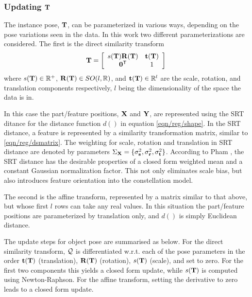 \subsubsection{Updating $\mathbf{T}$}
The instance pose, $\mathbf{T}$, can be parameterized in various ways, depending on the pose variations seen in the data. In this work two different parameterizations are considered. The first is the direct similarity transform
\begin{equation}
	\mathbf{T}=\left[\begin{array}{cc}
			s(\mathbf{T})\mathbf{R}(\mathbf{T}) & \mathbf{t}(\mathbf{T})\\
		\mathbf{0}^{\textsf{T}} & 1\end{array}\right]
	\label{eqn/reg/dsmatrix}
\end{equation}
where $s(\mathbf{T})\in\mathbb{R}^+$, $\mathbf{R}(\mathbf{T})\in SO(l,\mathbb{R})$, and $\mathbf{t}(\mathbf{T})\in\mathbb{R}^l$ are the scale, rotation, and translation components respectively, $l$ being the dimensionality of the space the data is in. 

In this case the part/feature positions, $\mathbf{X}$ and $\mathbf{Y}$, are represented using the SRT ditance \cite{Pham2011} for the distance function $d()$ in equation \ref{eqn/reg/shape}. In the SRT distance, a feature is represented by a similarity transformation matrix, similar to \ref{eqn/reg/dsmatrix}. The weighting for scale, rotation and translation in SRT distance are denoted by parameters ${\Sigma_{\mathbf{X}}} = \{{\sigma^{2}_{\mathbf{s}}}, {\sigma^{2}_{\mathbf{r}}}, {\sigma^{2}_{\mathbf{t}}}\}$.
According to Pham \etal \cite{Pham2011}, the SRT distance has the desirable properties of a closed form weighted mean and a constant Gaussian normalization factor. This not only eliminates scale bias, but also introduces feature orientation into the constellation model.

The second is the affine transform, represented by a matrix similar to that above, but whose first $l$ rows can take any real values. In this situation the part/feature positions are parameterized by translation only, and $d()$ is simply Euclidean distance.

The update steps for object pose are summarised as below. 
For the direct similarity transform, $\mathcal{Q}$ is differentiated w.r.t. each of the pose parameters in the order $\mathbf{t}(\mathbf{T})$ (translation), $\mathbf{R}(\mathbf{T})$ (rotation), $s(\mathbf{T})$ (scale), and set to zero. For the first two components this yields a closed form update, while $s(\mathbf{T})$ is computed using Newton-Raphson. For the affine transform, setting the derivative to zero leads to a closed form update.

